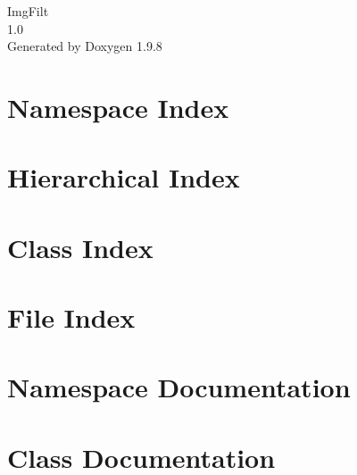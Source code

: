 \documentclass[twoside]{book}
\newcommand{\+}{\discretionary{\mbox{\scriptsize$\hookleftarrow$}}{}{}}
\newcommand{\clearemptydoublepage}{%
    \newpage{\pagestyle{empty}\cleardoublepage}%
  }
\begin{document}
  \raggedbottom
    \hypersetup{pageanchor=false,
                bookmarksnumbered=true,
                pdfencoding=unicode
               }
  \begin{titlepage}
  \vspace*{7cm}
  \begin{center}%
  {\Large Img\+Filt}\\
  [1ex]\large 1.\+0 \\
  \vspace*{1cm}
  {\large Generated by Doxygen 1.9.8}\\
  \end{center}
  \end{titlepage}
  \clearemptydoublepage
  \tableofcontents
  \clearemptydoublepage
  \hypersetup{pageanchor=true}
\chapter{Namespace Index}

\chapter{Hierarchical Index}

\chapter{Class Index}

\chapter{File Index}

\chapter{Namespace Documentation}

\chapter{Class Documentation}
















\end{document}

